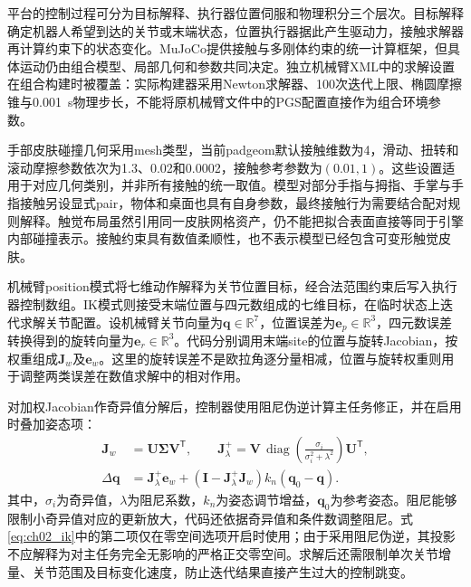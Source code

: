 平台的控制过程可分为目标解释、执行器位置伺服和物理积分三个层次。目标解释确定机器人希望到达的关节或末端状态，位置执行器据此产生驱动力，接触求解器再计算约束下的状态变化。MuJoCo提供接触与多刚体约束的统一计算框架\cite{todorov2012mujoco,mujoco2026computation}，但具体运动仍由组合模型、局部几何和参数共同决定。独立机械臂XML中的求解设置在组合构建时被覆盖：实际构建器采用Newton求解器、100次迭代上限、椭圆摩擦锥与0.001~s物理步长，不能将原机械臂文件中的PGS配置直接作为组合环境参数。

手部皮肤碰撞几何采用mesh类型，当前padgeom默认接触维数为4，滑动、扭转和滚动摩擦参数依次为1.3、0.02和0.0002，接触参考参数为$(0.01,1)$。这些设置适用于对应几何类别，并非所有接触的统一取值。模型对部分手指与拇指、手掌与手指接触另设显式pair，物体和桌面也具有自身参数，最终接触行为需要结合配对规则解释。触觉布局虽然引用同一皮肤网格资产，仍不能把拟合表面直接等同于引擎内部碰撞表示。接触约束具有数值柔顺性，也不表示模型已经包含可变形触觉皮肤。

机械臂position模式将七维动作解释为关节位置目标，经合法范围约束后写入执行器控制数组。IK模式则接受末端位置与四元数组成的七维目标，在临时状态上迭代求解关节配置。设机械臂关节向量为$\boldsymbol q\in\mathbb R^7$，位置误差为$\boldsymbol e_p\in\mathbb R^3$，四元数误差转换得到的旋转向量为$\boldsymbol e_r\in\mathbb R^3$。代码分别调用末端site的位置与旋转Jacobian，按权重组成$\boldsymbol J_w$及$\boldsymbol e_w$。这里的旋转误差不是欧拉角逐分量相减，位置与旋转权重则用于调整两类误差在数值求解中的相对作用。

对加权Jacobian作奇异值分解后，控制器使用阻尼伪逆计算主任务修正，并在启用时叠加姿态项：
\begin{equation}
 \begin{aligned}
  \boldsymbol J_w&=\boldsymbol U\boldsymbol\Sigma\boldsymbol V^{\mathsf T},\qquad
  \boldsymbol J_{\lambda}^{+}=\boldsymbol V\,
  \operatorname{diag}\!\left(\frac{\sigma_i}{\sigma_i^2+\lambda^2}\right)
  \boldsymbol U^{\mathsf T},\\
  \Delta\boldsymbol q&=\boldsymbol J_{\lambda}^{+}\boldsymbol e_w+
  \left(\boldsymbol I-\boldsymbol J_{\lambda}^{+}\boldsymbol J_w\right)
  k_n(\boldsymbol q_0-\boldsymbol q).
 \end{aligned}
 \label{eq:ch02_ik}
\end{equation}
其中，$\sigma_i$为奇异值，$\lambda$为阻尼系数，$k_n$为姿态调节增益，$\boldsymbol q_0$为参考姿态。阻尼能够限制小奇异值对应的更新放大，代码还依据奇异值和条件数调整阻尼。式\ref{eq:ch02_ik}中的第二项仅在零空间选项开启时使用；由于采用阻尼伪逆，其投影不应解释为对主任务完全无影响的严格正交零空间。求解后还需限制单次关节增量、关节范围及目标变化速度，防止迭代结果直接产生过大的控制跳变。

